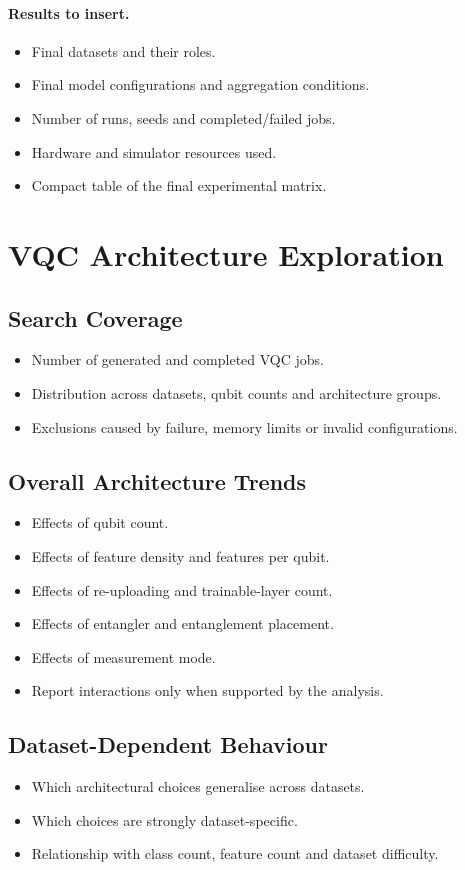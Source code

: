 \documentclass[]{UCD_CS_MSc_AAI_Report}
\newcommand{\resultplaceholder}{\paragraph{Results to insert.}}
\begin{document}
\resultplaceholder
\begin{itemize}
    \item Final datasets and their roles.
    \item Final model configurations and aggregation conditions.
    \item Number of runs, seeds and completed/failed jobs.
    \item Hardware and simulator resources used.
    \item Compact table of the final experimental matrix.
\end{itemize}

\section{VQC Architecture Exploration}
\label{sec:results-vqc-search}

\subsection{Search Coverage}
\begin{itemize}
    \item Number of generated and completed VQC jobs.
    \item Distribution across datasets, qubit counts and architecture groups.
    \item Exclusions caused by failure, memory limits or invalid configurations.
\end{itemize}

\subsection{Overall Architecture Trends}
\begin{itemize}
    \item Effects of qubit count.
    \item Effects of feature density and features per qubit.
    \item Effects of re-uploading and trainable-layer count.
    \item Effects of entangler and entanglement placement.
    \item Effects of measurement mode.
    \item Report interactions only when supported by the analysis.
\end{itemize}

\subsection{Dataset-Dependent Behaviour}
\begin{itemize}
    \item Which architectural choices generalise across datasets.
    \item Which choices are strongly dataset-specific.
    \item Relationship with class count, feature count and dataset difficulty.
\end{itemize}
\end{document}
